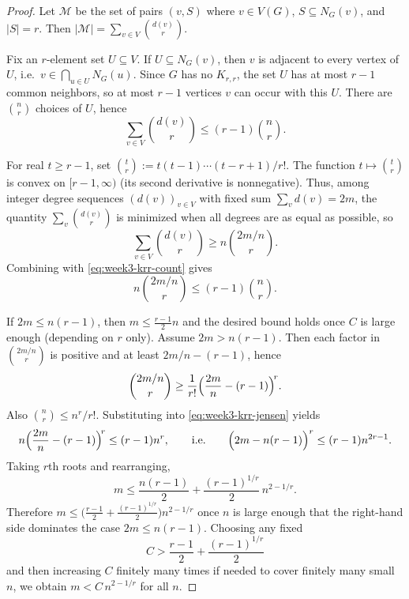 \documentclass[11pt, a4paper]{ctexrep}
\begin{document}
\begin{proof}
    Let $\mathcal{M}$ be the set of pairs $(v,S)$ where $v\in V(G)$, $S\subseteq N_G(v)$, and $|S|=r$.
    Then $|\mathcal{M}|=\sum_{v\in V}\binom{d(v)}{r}$.

    Fix an $r$-element set $U\subseteq V$.
    If $U\subseteq N_G(v)$, then $v$ is adjacent to every vertex of $U$, i.e.\ $v\in \bigcap_{u\in U}N_G(u)$.
    Since $G$ has no $K_{r,r}$, the set $U$ has at most $r-1$ common neighbors, so at most $r-1$ vertices $v$ can occur with this $U$.
    There are $\binom{n}{r}$ choices of $U$, hence
    \begin{equation}\label{eq:week3-krr-count}
        \sum_{v\in V}\binom{d(v)}{r}\le (r-1)\binom{n}{r}.
    \end{equation}

    For real $t\ge r-1$, set $\binom{t}{r}:=t(t-1)\cdots(t-r+1)/r!$.
    The function $t\mapsto \binom{t}{r}$ is convex on $[r-1,\infty)$ (its second derivative is nonnegative).
    Thus, among integer degree sequences $(d(v))_{v\in V}$ with fixed sum $\sum_v d(v)=2m$, the quantity $\sum_v \binom{d(v)}{r}$ is minimized when all degrees are as equal as possible, so
    \[
        \sum_{v\in V}\binom{d(v)}{r}\ge n\binom{2m/n}{r}.
    \]
    Combining with \eqref{eq:week3-krr-count} gives
    \begin{equation}\label{eq:week3-krr-jensen}
        n\binom{2m/n}{r}\le (r-1)\binom{n}{r}.
    \end{equation}

    If $2m\le n(r-1)$, then $m\le \tfrac{r-1}{2}n$ and the desired bound holds once $C$ is large enough (depending on $r$ only).
    Assume $2m>n(r-1)$. Then each factor in $\binom{2m/n}{r}$ is positive and at least $2m/n-(r-1)$, hence
    \[
        \binom{2m/n}{r}\ge \frac{1}{r!}\Bigl(\frac{2m}{n}-(r-1)\Bigr)^{\!r}.
    \]
    Also $\binom{n}{r}\le n^r/r!$.
    Substituting into \eqref{eq:week3-krr-jensen} yields
    \[
        n\Bigl(\frac{2m}{n}-(r-1)\Bigr)^{\!r}\le (r-1)n^r,
        \qquad\text{i.e.}\qquad
        \Bigl(2m-n(r-1)\Bigr)^r\le (r-1)n^{2r-1}.
    \]
    Taking $r$th roots and rearranging,
    \[
        m\le \frac{n(r-1)}{2}+\frac{(r-1)^{1/r}}{2}\,n^{2-1/r}.
    \]
    Therefore $m\le \bigl(\tfrac{r-1}{2}+\tfrac{(r-1)^{1/r}}{2}\bigr)n^{2-1/r}$ once $n$ is large enough that the right-hand side dominates the case $2m\le n(r-1)$.
    Choosing any fixed
    \[
        C>\frac{r-1}{2}+\frac{(r-1)^{1/r}}{2}
    \]
    and then increasing $C$ finitely many times if needed to cover finitely many small $n$, we obtain $m<C\,n^{2-1/r}$ for all $n$.
\end{proof}
\end{document}

